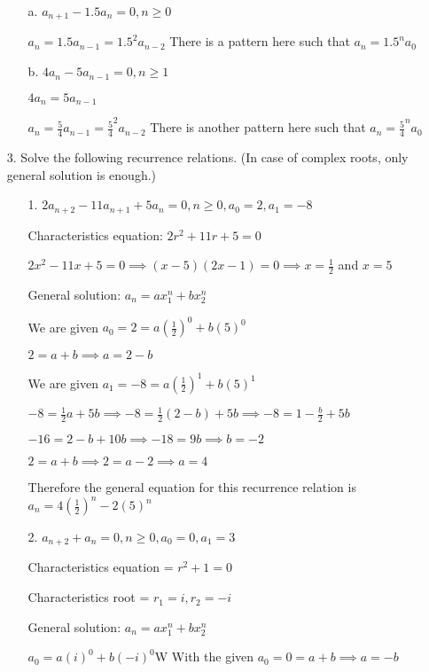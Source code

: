 \documentclass[letterpaper,11pt]{article}
\begin{document}
\begin{enumerate}
    \begin{enumerate}
        \item [a.] $a_{n+1}-1.5a_n=0, n \geq 0$
        \item [] $a_n=1.5a_{n-1} = 1.5^2a_{n-2}$ There is a pattern here such that $a_n = 1.5^n a_0$
        \item [b.] $4a_n - 5a_{n-1} = 0, n \geq 1$
        \item [] $4a_n = 5a_{n-1}$
        \item [] $a_n = \frac{5}{4}a_{n-1} = \frac{5}{4}^2a_{n-2}$ There is another pattern here such that $a_n = \frac{5}{4}^na_0$
    \end{enumerate}
    \newpage
    \item [3.] Solve the following recurrence relations. (In case of complex roots, only general solution is enough.)
    \begin{enumerate}
        \item [1.] $2a_{n+2} - 11a_{n+1} +5a_n = 0, n \geq 0, a_0 = 2, a_1 = -8$
        \item [] Characteristics equation: $2r^2+11r+5 = 0$
        \item [] $2x^2-11x+5 = 0 \implies (x-5)(2x-1) = 0 \implies x = \frac{1}{2}$ and $x={5}$
        \item [] General solution: $a_n = ax_1^n + bx_2^n$
        \item [] We are given $a_0 = 2 = a(\frac{1}{2})^0 + b(5)^0$
        \item [] $2 = a+b \implies a=2-b$
        \item [] We are given $a_1 = -8 = a(\frac{1}{2})^1 + b(5)^1$
        \item [] $-8 = \frac{1}{2}a + 5b \implies -8 = \frac{1}{2} (2-b) + 5b \implies -8 = 1-\frac{b}{2}+5b$
        \item [] $-16 = 2-b+10b \implies -18 = 9b \implies b = -2$
        \item [] $2=a+b \implies 2=a-2 \implies a=4$
        \item [] Therefore the general equation for this recurrence relation is $a_n = 4(\frac{1}{2})^n-2(5)^n$
        \item[2.] $a_{n+2} + a_n = 0, n \geq 0, a_0 = 0, a_1 = 3$
        \item[] Characteristics equation = $r^2+1 = 0$
        \item[] Characteristics root = $r_1 = i, r_2=-i$
        \item[] General solution: $a_n = ax_1^n + bx_2^n$
        \item[] $a_0 = a(i)^0+b(-i)^0$W With the given $a_0 = 0 = a+b \implies a = -b$

\end{enumerate}
\end{enumerate}
\end{document}
